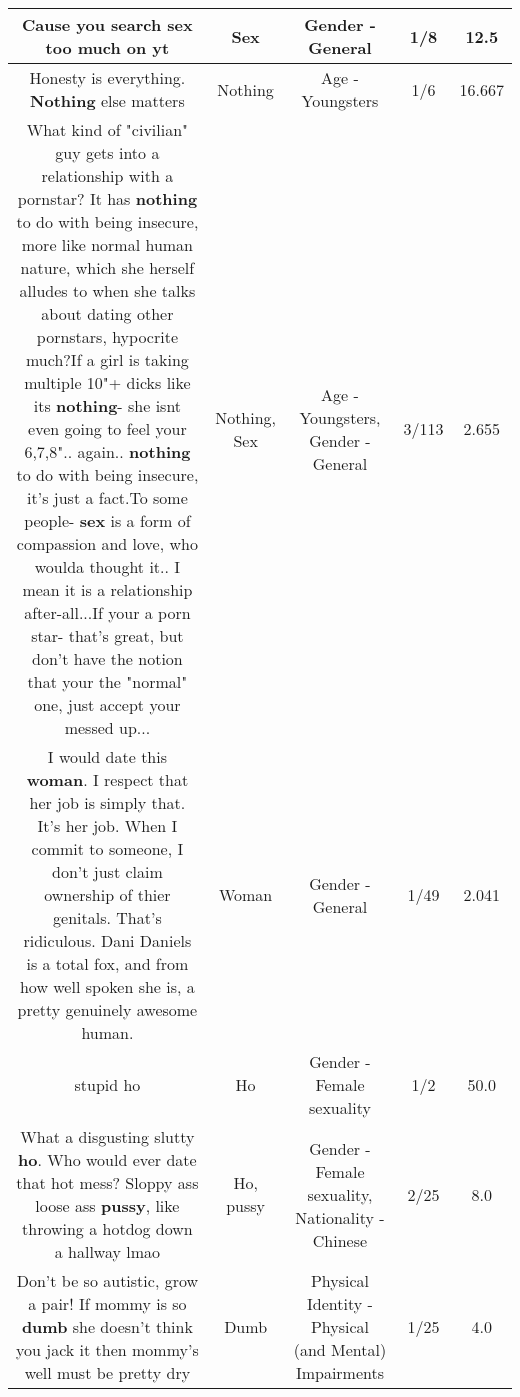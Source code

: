 \documentclass[11pt]{article}
\newlength\mylength
\begin{document}
\begin{center}
\begin{longtable}{|C{.65\mylength}|C{.30\mylength}|C{.12\mylength}|C{.12\mylength}|C{.12\mylength}|}
  \small Cause you search \textbf{sex} too much on yt\normalsize   & Sex & Gender - General & 1/8 & 12.5 \\  \hline
  \small Honesty is everything. \textbf{Nothing} else matters\normalsize   & Nothing & Age - Youngsters & 1/6 & 16.667 \\  \hline
  \small What kind of "civilian" guy gets into a relationship with a pornstar? It has \textbf{nothing} to do with being insecure, more like normal human nature, which she herself alludes to when she talks about dating other pornstars, hypocrite much?If a girl is taking multiple 10"+ dicks like its \textbf{nothing}- she isnt even going to feel your 6,7,8".. again.. \textbf{nothing} to do with being insecure, it's just a fact.To some people- \textbf{sex} is a form of compassion and love, who woulda thought it.. I mean it is a relationship after-all...If your a porn star- that's great, but don't have the notion that your the "normal" one, just accept your messed up...\normalsize   & Nothing, Sex & Age - Youngsters, Gender - General & 3/113 & 2.655 \\  \hline
  \small I would date this \textbf{woman}. I respect that her job is simply that.  It's her job. When I commit to someone, I don't just claim ownership of thier genitals.  That's ridiculous.  Dani Daniels is a total fox, and from how well spoken she is, a pretty genuinely awesome human.\normalsize   & Woman & Gender - General & 1/49 & 2.041 \\  \hline
  \small stupid ho\normalsize   & Ho & Gender - Female sexuality & 1/2 & 50.0 \\  \hline
  \small What a disgusting slutty \textbf{ho}. Who would ever date that hot mess? Sloppy ass loose ass \textbf{pussy}, like throwing a hotdog down a hallway lmao\normalsize   & Ho, pussy & Gender - Female sexuality, Nationality - Chinese & 2/25 & 8.0 \\  \hline
  \small Don't be so autistic, grow a pair! If mommy is so \textbf{dumb} she doesn't think you jack it then mommy's well must be pretty dry\normalsize   & Dumb & Physical Identity - Physical (and Mental) Impairments & 1/25 & 4.0 \\  \hline

\end{longtable}
\end{center}
\end{document}
